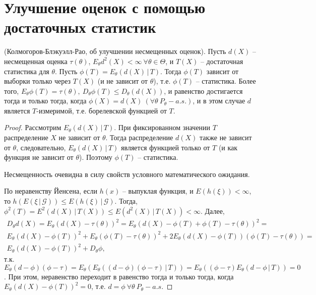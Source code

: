 \section{Улучшение оценок с помощью достаточных статистик}
\begin{theorem}
    (Колмогоров-Блэкуэлл-Рао, об улучшении несмещенных оценок). Пусть $d(X)$ -- несмещенная оценка $\tau(\theta)$, $E_\theta d^2(X) < \infty\ \forall \theta \in \Theta$, и $T(X)$ -- достаточная статистика для $\theta$. Пусть $\phi(T) = E_\theta(d(X)\, \vert\, T)$. Тогда $\phi(T)$ зависит от выборки только через $T(X)$ (и не зависит от $\theta$), т.е. $\phi(T)$ -- статистика. Более того, $E_\theta \phi(T) = \tau(\theta),\ D_\theta \phi(T) \leq D_\theta(d(X))$, и равенство достигается тогда и только тогда, когда $\phi(X) = d(X)\ (\forall \theta\ P_\theta-a.s.)$, и в этом случае $d$ является $T$-измеримой, т.е. борелевской функцией от $T$.
\end{theorem}
\begin{proof}
    Рассмотрим  $E_\theta(d(X)\, \vert\, T)$. При фиксированном значении $T$ распределение $X$ не зависит от $\theta$. Тогда распределение $d(X)$ также не зависит от $\theta$, следовательно, $E_\theta(d(X)\, \vert\, T)$ является функцией только от $T$ (и как функция не зависит от $\theta$). Поэтому $\phi(T)$ -- статистика.
    
    Несмещенность очевидна в силу свойств условного математического ожидания.
    
    По неравенству Йенсена, если $h(x)$ -- выпуклая функция, и $E(h(\xi))<\infty$, то $h(E(\xi\, \vert\, \mathcal{G})) \leq E(h(\xi)\, \vert\, \mathcal{G})$. Тогда, $\phi^2(T) = E^2(d(X)\, \vert\, T(X)) \leq E(d^2(X)\, \vert\, T(X)) < \infty$. Далее,
    \begin{gather*}
        D_\theta d(X) = E_\theta(d(X) - \tau(\theta))^2 = E_\theta(d(X) - \phi(T) + \phi(T) - \tau(\theta))^2 =\\
        E_\theta(d(X) - \phi(T))^2 + E_\theta(\phi(T) - \tau(\theta))^2 + 2E_\theta(d(X) - \phi(T))(\phi(T) - \tau(\theta)) =\\ E_\theta(d(X) - \phi(T))^2 + D_\theta\phi,
    \end{gather*}
    т.к. $E_\theta(d - \phi)(\phi - \tau) = E_\theta(E_\theta((d-\phi)(\phi - \tau)\, \vert\, T)) = E_\theta((\phi - \tau)E_\theta(d - \phi\, \vert\, T)) = 0$.
    При этом, неравенство переходит в равенство тогда и только тогда, когда $E_\theta(d(X)-\phi(T))^2 = 0$, т.е. $d=\phi\ \forall \theta\ P_\theta-a.s.$
\end{proof}
